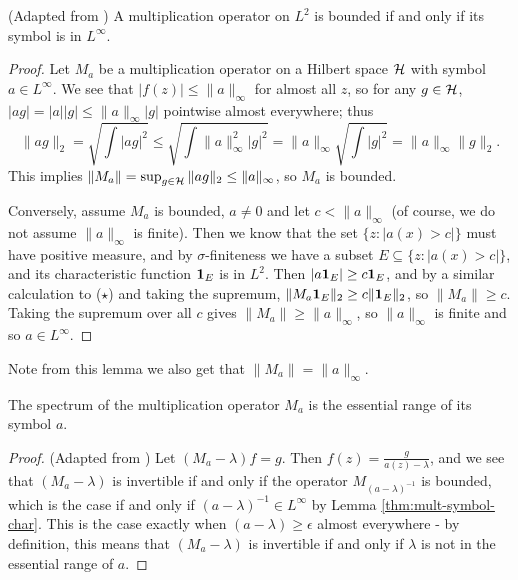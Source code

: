 \documentclass[../main.tex]{subfiles}
\begin{document}
\begin{lemma}
\label{thm:mult-symbol-char}
(Adapted from \cite{arveson2002short})
  A multiplication operator on $L^2$ is bounded if and only if its symbol is in
  $L^\infty$.
\end{lemma}
\begin{proof}
Let $M_a$ be a multiplication operator on a Hilbert space $\mathcal{H}$ with symbol
$a \in L^\infty$. We see that $|f(z)| \leq \|a\|_\infty$ for almost all
$z$, so for any $g \in \mathcal{H}$, $|a g| = |a||g| \leq \|a\|_\infty |g|$
pointwise almost everywhere; thus
\begin{equation*}
\|a g\|_2 = \sqrt{\int |a g|^2} \leq \sqrt{\int \|a\|_\infty^2|g|^2} 
	  = \|a\|_\infty \sqrt{\int |g|^2} = \|a\|_\infty \|g\|_2.
\tag{$\star$}
\end{equation*}
This implies $\|M_a\| = \sup_{g \in \mathcal{H}} \|a g\|_2 \leq \|a\|_\infty$, so $M_a$ is bounded.

Conversely, assume $M_a$ is bounded, $a \neq 0$ and let $c < \|a\|_\infty$ (of
course, we do not assume $\|a\|_\infty$ is finite). Then we know that
the set $\{z : |a(x) > c|\}$ must have positive measure, and by
$\sigma$-finiteness we have a subset $E \subseteq \{z : |a(x) > c|\}$,
and its characteristic 
function $\mathbf{1}_E$ is in $L^2$. Then $|a \mathbf{1}_E| \geq c \mathbf{1}_E$, and by a similar
calculation to ($\star$) and taking the supremum, $\|M_a  \mathbf{1}_E\|_2 \geq c
\|\mathbf{1}_E\|_2$, so $\|M_a\| \geq c$. Taking the supremum over all $c$ gives
$\|M_a\| \geq \|a\|_\infty$, so $\|a\|_\infty$ is finite and so $a \in
L^\infty$. \end{proof}

Note from this lemma we also get that $\|M_a\| = \|a\|_\infty$.

\begin{theorem}
  \label{thm:mult-op-spec}
  The spectrum of the multiplication operator $M_a$ is the essential range of its symbol $a$.
\end{theorem}
\begin{proof}
(Adapted from \cite{garcia2023operator})
Let $(M_a - \lambda)f = g$. Then $f(z) = \frac{g}{a(z) - \lambda}$, and we see
that $(M_a - \lambda)$ is invertible if and only if the operator 
$M_{(a - \lambda)^{-1}}$ is bounded, which is the case if and only if
$(a - \lambda)^{-1} \in L^\infty$ by Lemma \ref{thm:mult-symbol-char}.
This is the case exactly when $(a - \lambda) \geq \epsilon$ almost everywhere -
by definition, this means that $(M_a - \lambda)$ is invertible if and
only if $\lambda$ is not in the essential range of $a$.
\end{proof}
\end{document}
